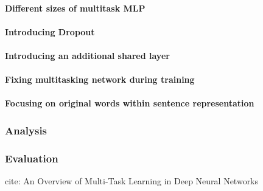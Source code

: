 \paragraph{Different sizes of multitask MLP}
\paragraph{Introducing Dropout}
\paragraph{Introducing an additional shared layer}
\paragraph{Fixing multitasking network during training}
\paragraph{Focusing on original words within sentence representation}
\subsubsection{Analysis}
\subsubsection{Evaluation}

cite: An Overview of Multi-Task Learning
in Deep Neural Networks